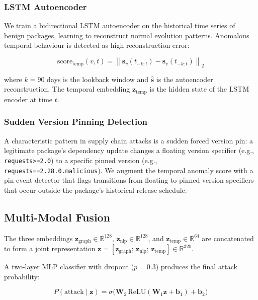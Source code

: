 \documentclass[sigconf,nonacm]{acmart}
\begin{document}
\subsubsection{LSTM Autoencoder}

We train a bidirectional LSTM autoencoder on the historical time series of benign
packages, learning to reconstruct normal evolution patterns. Anomalous temporal
behaviour is detected as high reconstruction error:

\begin{equation}
  \text{score}_\text{temp}(v, t) = \left\|\mathbf{s}_v(t_{-k:t}) -
  \hat{\mathbf{s}}_v(t_{-k:t})\right\|_2
\end{equation}

where $k = 90$ days is the lookback window and $\hat{\mathbf{s}}$ is the
autoencoder reconstruction. The temporal embedding $\mathbf{z}_\text{temp}$
is the hidden state of the LSTM encoder at time $t$.

\subsubsection{Sudden Version Pinning Detection}

A characteristic pattern in supply chain attacks is a sudden forced version pin:
a legitimate package's dependency update changes a floating version specifier
(e.g., \texttt{requests>=2.0}) to a specific pinned version (e.g.,
\texttt{requests==2.28.0.malicious}). We augment the temporal anomaly score with
a pin-event detector that flags transitions from floating to pinned version
specifiers that occur outside the package's historical release schedule.

\subsection{Multi-Modal Fusion}

The three embeddings $\mathbf{z}_\text{graph} \in \mathbb{R}^{128}$,
$\mathbf{z}_\text{nlp} \in \mathbb{R}^{128}$, and $\mathbf{z}_\text{temp} \in
\mathbb{R}^{64}$ are concatenated to form a joint representation
$\mathbf{z} = [\mathbf{z}_\text{graph};\, \mathbf{z}_\text{nlp};\,
\mathbf{z}_\text{temp}] \in \mathbb{R}^{320}$.

A two-layer MLP classifier with dropout ($p=0.3$) produces the final attack
probability:

\begin{equation}
  P(\text{attack} \mid \mathbf{z}) = \sigma\!\bigl(
    \mathbf{W}_2\, \text{ReLU}(\mathbf{W}_1 \mathbf{z} + \mathbf{b}_1)
    + \mathbf{b}_2 \bigr)
\end{equation}
\end{document}
